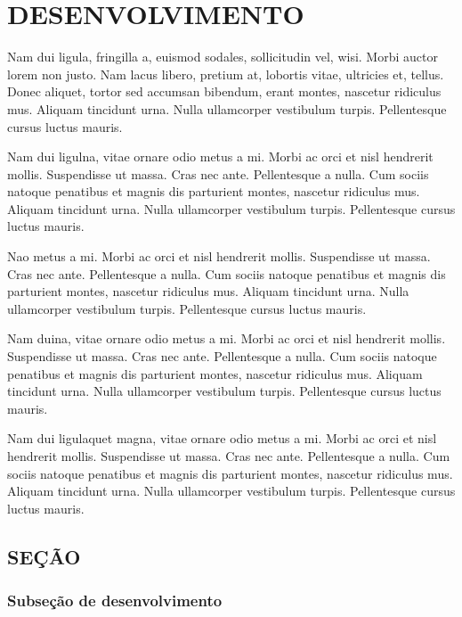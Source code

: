 \chapter{DESENVOLVIMENTO}


Nam dui ligula, fringilla a, euismod sodales, sollicitudin vel, wisi. Morbi auctor lorem non justo. Nam lacus libero, pretium at, lobortis vitae, ultricies et, tellus. Donec aliquet, tortor sed accumsan bibendum, erant montes, nascetur ridiculus mus. Aliquam tincidunt urna. Nulla ullamcorper vestibulum turpis. Pellentesque cursus luctus mauris. \cite{LUCKMANN2008}

Nam dui ligulna, vitae ornare odio metus a mi. Morbi ac orci et nisl hendrerit mollis. Suspendisse ut massa. Cras nec ante. Pellentesque a nulla. Cum sociis natoque penatibus et magnis dis parturient montes, nascetur ridiculus mus. Aliquam tincidunt urna. Nulla ullamcorper vestibulum turpis. Pellentesque cursus luctus mauris. \cite{Telles1984}

Nao metus a mi. Morbi ac orci et nisl hendrerit mollis. Suspendisse ut massa. Cras nec ante. Pellentesque a nulla. Cum sociis natoque penatibus et magnis dis parturient montes, nascetur ridiculus mus. Aliquam tincidunt urna. Nulla ullamcorper vestibulum turpis. Pellentesque cursus luctus mauris. \cite{abntex2-wiki-como-customizar}

Nam duina, vitae ornare odio metus a mi. Morbi ac orci et nisl hendrerit mollis. Suspendisse ut massa. Cras nec ante. Pellentesque a nulla. Cum sociis natoque penatibus et magnis dis parturient montes, nascetur ridiculus mus. Aliquam tincidunt urna. Nulla ullamcorper vestibulum turpis. Pellentesque cursus luctus mauris. \cite{abntex2modelo}

Nam dui ligulaquet magna, vitae ornare odio metus a mi. Morbi ac orci et nisl hendrerit mollis. Suspendisse ut massa. Cras nec ante. Pellentesque a nulla. Cum sociis natoque penatibus et magnis dis parturient montes, nascetur ridiculus mus. Aliquam tincidunt urna. Nulla ullamcorper vestibulum turpis. Pellentesque cursus luctus mauris. \cite{memoir}

\section{SEÇÃO}

\lipsum[1-1]
\subsection{Subseção de desenvolvimento}

